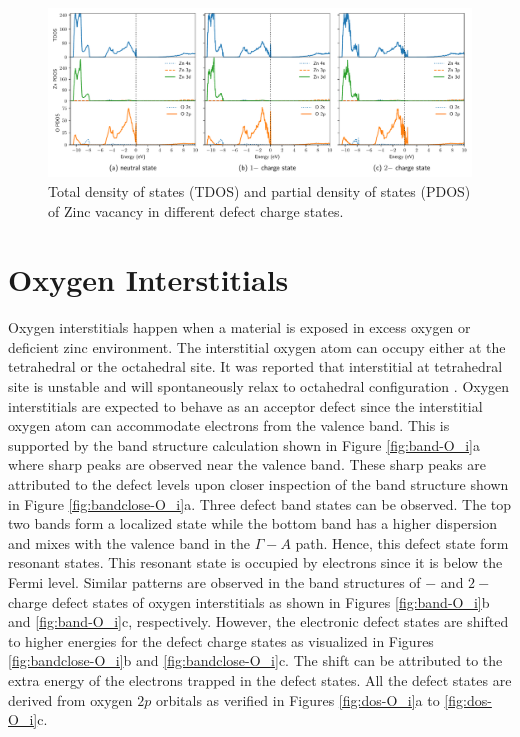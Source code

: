 \clearpage

\begin{figure}[t!]
	\centering
	\includegraphics[width=1\textwidth]{"images/rnd/Zn_vac-dos"}
	\caption[Total density of states (TDOS) and partial density of states (PDOS) of Zinc vacancy in different  defect charge states]{Total density of states (TDOS) and partial density of states (PDOS) of Zinc vacancy in different  defect charge states.}
	\label{fig:dos-Zn_vac}
\end{figure}


\section{Oxygen Interstitials}
Oxygen interstitials happen when a material is exposed in excess oxygen or deficient zinc environment. The interstitial oxygen atom can occupy either at the tetrahedral or the octahedral site. It was reported that interstitial at tetrahedral site is unstable and will spontaneously relax to octahedral configuration \citep{Erhart2005}. Oxygen interstitials are expected to behave as an acceptor defect since the interstitial oxygen atom can accommodate electrons from the valence band. This is supported by the band structure calculation shown in Figure \ref{fig:band-O_i}a where sharp peaks are observed near the valence band.  These sharp peaks are attributed to the defect levels upon  closer inspection of the band structure shown in Figure \ref{fig:bandclose-O_i}a. Three defect band states can be observed. The top two bands form a localized state while the bottom band has a higher dispersion and mixes with the valence band in the $\Gamma-A$ path. Hence, this defect state form resonant states. This resonant state is occupied by electrons since it is below the Fermi level. Similar patterns are observed in the band structures of $-$ and $2-$ charge defect states of oxygen interstitials as shown in Figures \ref{fig:band-O_i}b and \ref{fig:band-O_i}c, respectively. However, the electronic defect states are shifted to higher energies for the  defect charge states as visualized in Figures   \ref{fig:bandclose-O_i}b and \ref{fig:bandclose-O_i}c. The shift can be attributed to the extra energy of  the electrons trapped in the defect states. All the defect states are derived from oxygen $2p$ orbitals as verified in Figures \ref{fig:dos-O_i}a to \ref{fig:dos-O_i}c.

